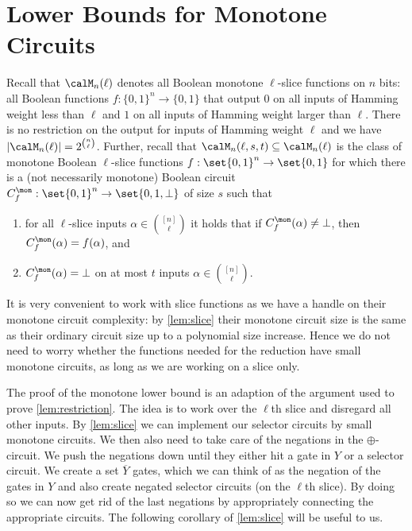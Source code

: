 \section{Lower Bounds for Monotone Circuits}
\label{sec:monotone-degree-LB}

Recall that $\calM_n(\ell)$ denotes all Boolean monotone $\ell$-slice
functions on $n$ bits: all Boolean functions
$f: \{0,1\}^n \rightarrow \{0,1\}$ that output $0$ on all inputs of
Hamming weight less than $\ell$ and $1$ on all inputs of Hamming
weight larger than $\ell$. There is no restriction on the output for
inputs of Hamming weight $\ell$ and we have
$|\calM_n(\ell)| = 2^{\binom{n}{\ell}}$.
%
Further, recall that $\calM_n(\ell, s, t) \subseteq \calM_n(\ell)$ is
the class of monotone Boolean $\ell$-slice functions
$f: \set{0,1}^n \rightarrow \set{0,1}$ for which there is a
(not necessarily monotone) Boolean circuit
$C_f^\mon: \set{0,1}^n \rightarrow \set{0,1, \bot}$ of size $s$ such
that
\begin{enumerate}
\item for all $\ell$-slice inputs $\alpha \in \binom{[n]}{\ell}$ it
  holds that if $C^\mon_f(\alpha) \neq \bot$, then
  $C^\mon_f(\alpha) = f(\alpha)$, and
\item $C^\mon_f(\alpha) = \bot$ on at most $t$ inputs
  $\alpha \in \binom{[n]}{\ell}$.
\end{enumerate}

It is very convenient to work with slice functions as we have a handle
on their monotone circuit complexity: by \cref{lem:slice} their
monotone circuit size is the same as their ordinary circuit size up to
a polynomial size increase. Hence we do not need to worry whether the
functions needed for the reduction have small monotone circuits, as
long as we are working on a slice only. 

The proof of the monotone lower bound is an adaption of the argument
used to prove
\cref{lem:restriction}. %
The idea is to work over
the $\ell$th slice and disregard all other inputs.  By
\cref{lem:slice} we can implement our selector circuits by small
monotone circuits. We then also need to take care of the negations in
the $\oplus$-circuit. We push the negations down until they either hit
a gate in $Y$ or a selector circuit. We create a set $\overline Y$
gates, which we can think of as the negation of the gates in $Y$ and
also create negated selector circuits (on the $\ell$th slice). By
doing so we can now get rid of the last negations by appropriately
connecting the appropriate circuits. The following corollary of
\cref{lem:slice} will be useful to us.

